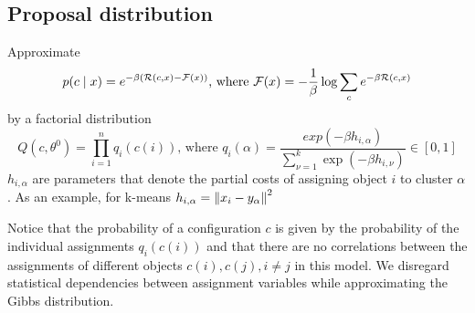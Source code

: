 \documentclass[12pt]{article}
\begin{document}
\subsection{Proposal distribution}
\par Approximate
\[ p(c\mid x) = e^{-\beta(\mathcal{R}(c,x)-\mathcal{F}(x))} \text{, where } \mathcal{F}(x) = -\frac{1}{\beta} \log\sum_c e^{-\beta\mathcal{R}(c,x)} \]
by a factorial distribution
\[ Q(c,\theta^0) = \prod_{i=1}^n q_i(c(i)) \text{, where } 
q_i(\alpha) = \frac{exp(-\beta h_{i,\alpha})}{\sum_{\nu =1}^k \exp(-\beta h_{i,\nu})} \in [0,1] \]
$h_{i,\alpha}$ are parameters that denote the partial costs of assigning object $i$ to cluster $\alpha$. As an example, for k-means $h_{i,\alpha} = \left\lVert x_i - y_{\alpha}\right\rVert^2$
\par Notice that the probability of a configuration $c$ is given by the probability of the individual assignments $q_i(c(i))$ and that there are no correlations between the assignments of different objects $c(i), c(j), i \neq j$ in this model. We disregard statistical dependencies between assignment variables while approximating the Gibbs distribution.
\end{document}
